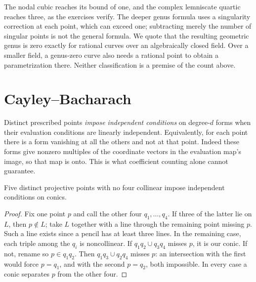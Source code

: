 The nodal cubic reaches its bound of one, and the complex lemniscate quartic reaches three, as the exercises verify. The deeper genus formula uses a singularity correction at each point, which can exceed one; subtracting merely the number of singular points is not the general formula. We quote that the resulting geometric genus is zero exactly for rational curves over an algebraically closed field. Over a smaller field, a genus-zero curve also needs a rational point to obtain a parametrization there. Neither classification is a premise of the count above.

\section{Cayley--Bacharach}

Distinct prescribed points \emph{impose independent conditions} on degree-$d$ forms when their evaluation conditions are linearly independent. Equivalently, for each point there is a form vanishing at all the others and not at that point. Indeed these forms give nonzero multiples of the coordinate vectors in the evaluation map's image, so that map is onto. This is what coefficient counting alone cannot guarantee.

\begin{lemma}\label{geometry:lem:fivepointsconics}
Five distinct projective points with no four collinear impose independent conditions on conics.
\end{lemma}
\begin{proof}
Fix one point $p$ and call the other four $q_1,\ldots,q_4$. If three of the latter lie on $L$, then $p\notin L$; take $L$ together with a line through the remaining point missing $p$. Such a line exists since a pencil has at least three lines. In the remaining case, each triple among the $q_i$ is noncollinear. If $q_1q_2\cup q_3q_4$ misses $p$, it is our conic. If not, rename so $p\in q_1q_2$. Then $q_1q_3\cup q_2q_4$ misses $p$: an intersection with the first would force $p=q_1$, and with the second $p=q_2$, both impossible. In every case a conic separates $p$ from the other four.
\end{proof}

